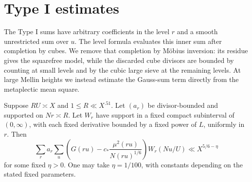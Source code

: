 \section{Type I estimates}
\label{sec:typeI}

The Type I sums have arbitrary coefficients in the level $r$
and a smooth unrestricted sum over $u$. The level formula evaluates
this inner sum after completion by cubes. We remove that completion by
M\"obius inversion: its residue gives the squarefree model, while the
discarded cube divisors are bounded by counting at small levels and by
the cubic large sieve at the remaining levels. At large Mellin heights
we instead estimate the Gauss-sum term directly from the metaplectic
mean square.

\begin{proposition}
\label{prop:typeI}
Suppose $RU\asymp X$ and $1\le R\ll X^{.51}$.
Let $(a_r)$ be divisor-bounded and supported on $Nr\asymp R$.
Let $W_r$ have support in a fixed compact subinterval of $(0,\infty)$,
with each fixed derivative bounded by a fixed power of $L$, uniformly
in $r$. Then
\[
 \sum_r a_r\sum_u
 \left(G(ru)-c_*\frac{\mu^2(ru)}{N(ru)^{1/6}}\right)W_r(Nu/U)
 \ll X^{5/6-\eta}
\]
for some fixed $\eta>0$. One may take $\eta=1/100$, with constants
depending on the stated fixed parameters.
\end{proposition}

